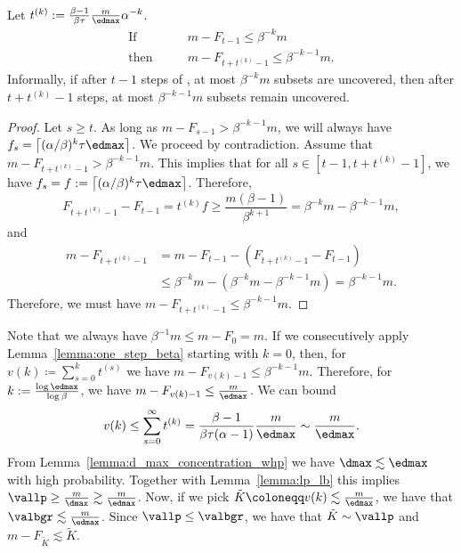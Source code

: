 \begin{lemma} \label{lemma:one_step_beta}
    Let \(t^{(k)} := \frac{\beta - 1}{\beta\tau} \frac{m}{\edmax} \alpha^{-k}\). 
    \begin{equation*}
        \begin{aligned}
            \text{If} \qquad &m - F_{t-1} \leq \beta^{-k} m  \\
            \text{then} \qquad &m - F_{t+t^{(k)}-1} \leq \beta^{-k-1} m.
        \end{aligned}
    \end{equation*}
    Informally, if after \(t - 1\) steps of \bgreedy, at most \(\beta^{-k} m\) subsets are uncovered, then after \(t + t^{(k)} - 1\) steps, at most \(\beta^{-k-1}m\) subsets remain uncovered.
\end{lemma}
\begin{proof}
    Let \(s \geq t\). As long as \(m - F_{s - 1} > \beta^{-k-1}m\), we will always have \(f_s = \bigl\lceil (\alpha / \beta)^{k} \tau \edmax\bigr\rceil\). We proceed by contradiction. Assume that \(m - F_{t + t^{(k)} - 1} > \beta^{-k-1}m\). This implies that for all \(s \in [t - 1, t + t^{(k)} - 1]\), we have \(f_s = f := \bigl\lceil (\alpha / \beta)^{k} \tau \edmax\bigr\rceil\). Therefore, 
    \begin{equation*}
    F_{t + t^{(k)} - 1} - F_{t - 1} = t^{(k)} f \geq \frac{m(\beta - 1)}{\beta^{k+1}} = \beta^{-k}m - \beta^{-k-1}m,
    \end{equation*}
    and 
    \begin{equation*}
    \begin{aligned}
    m - F_{t + t^{(k)} - 1} &= m - F_{t - 1} - \left(F_{t + t^{(k)} - 1} - F_{t - 1}\right) \\
    & \leq \beta^{-k}m - (\beta^{-k}m - \beta^{-k-1}m) = \beta^{-k-1}m.
    \end{aligned}
    \end{equation*}
    Therefore, we must have \(m - F_{t + t^{(k)} - 1} \leq \beta^{-k-1}m\).
\end{proof}
\noindent
Note that we always have \(\beta^{-1}m \leq m - F_0 = m\).
If we consecutively apply Lemma~\ref{lemma:one_step_beta} starting with \(k = 0\), then, for \(v(k) \coloneqq \sum_{s=0}^k t^{(s)}\) we have \(m - F_{v(k) - 1} \leq \beta^{-k-1} m\). Therefore, for \(k := \frac{\log \edmax}{\log {\beta}}\), we have \(m - F_{v(k) - 1} \leq \frac{m}{\edmax}\). We can bound
\begin{equation*}
v(k) \leq \sum_{s = 0}^{\infty} t^{(k)} = \frac{\beta - 1}{\beta \tau (\alpha - 1)} \frac{m}{\edmax} \sim \frac m \edmax.
\end{equation*}
From Lemma~\ref{lemma:d_max_concentration_whp} we have \(\dmax \lesssim \edmax\) with high probability. Together with Lemma~\ref{lemma:lp_lb} this implies \(\vallp \geq \frac{m}{\dmax} \gtrsim \frac m \edmax\).
Now, if we pick \(\tilde K \coloneqq v(k) \lesssim \frac m \edmax \), we have that \(\valbgr \lesssim \frac m \edmax\). Since \(\vallp \leq \valbgr\), we have that \(\tilde K \sim \vallp\) and \(m - F_{\tilde K} \lesssim \tilde K\). 

